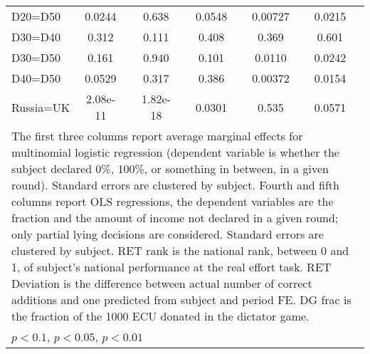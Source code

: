 \begin{tabular}{l|cccccc|cc|cc}
D20=D50         &   0.0244         &         &    0.638         &         &   0.0548         &         &  0.00727         &         &   0.0215         &         \\
D30=D40         &    0.312         &         &    0.111         &         &    0.408         &         &    0.369         &         &    0.601         &         \\
D30=D50         &    0.161         &         &    0.940         &         &    0.101         &         &   0.0110         &         &   0.0242         &         \\
D40=D50         &   0.0529         &         &    0.317         &         &    0.386         &         &  0.00372         &         &   0.0154         &         \\
Russia=UK       & 2.08e-11         &         & 1.82e-18         &         &   0.0301         &         &    0.535         &         &   0.0571         &         \\
\hline\hline
\multicolumn{11}{p{18cm}}{\tiny The first three columns report average marginal effects for multinomial logistic regression (dependent variable is whether the subject declared 0\%, 100\%, or something in between, in a given round). Standard errors are clustered by subject. Fourth and fifth columns report OLS regressions, the dependent variables are the fraction and the amount of income not declared in a given round; only partial lying decisions are considered. Standard errors are clustered by subject. RET rank is the national rank, between 0 and 1, of subject's national performance at the real effort task. RET Deviation is the difference between actual number of correct additions and one predicted from subject and period FE. DG frac is the fraction of the 1000 ECU donated in the dictator game.}\\
\multicolumn{11}{l}{\tiny \sym{*} \(p<0.1\), \sym{**} \(p<0.05\), \sym{***} \(p<0.01\)}\\
\end{tabular}